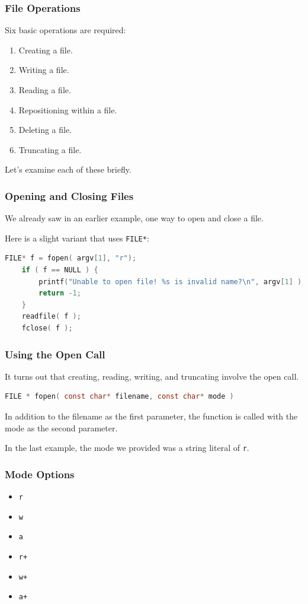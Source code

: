 \begin{frame}
	\frametitle{File Operations}
	Six basic operations are required:

	\begin{enumerate}
		\item Creating a file.
		\item Writing a file.
		\item Reading a file.
		\item Repositioning within a file.
		\item Deleting a file.
		\item Truncating a file.
	\end{enumerate}

	Let's examine each of these briefly.

\end{frame}


\begin{frame}[fragile]
	\frametitle{Opening and Closing Files}
	We already saw in an earlier example, one way to open and close a file.
	
	Here is a slight variant that uses \texttt{FILE*}:
	
	\begin{lstlisting}[language=C]
    FILE* f = fopen( argv[1], "r");
    if ( f == NULL ) {
        printf("Unable to open file! %s is invalid name?\n", argv[1] );
        return -1;
    }
    readfile( f );
    fclose( f );
\end{lstlisting}
\end{frame}



\begin{frame}[fragile]
	\frametitle{Using the Open Call}

	It turns out that creating, reading, writing, and truncating involve the open call.

	\begin{lstlisting}[language=C]
FILE * fopen( const char* filename, const char* mode )
\end{lstlisting}

	In addition to the filename as the first parameter, the function is called with the mode as the second parameter.

	In the last example, the mode we provided was a string literal of \texttt{r}.

\end{frame}


\begin{frame}
	\frametitle{Mode Options}

	\begin{itemize}
		\item \texttt{r}
		\item \texttt{w}
		\item \texttt{a}
		\item \texttt{r+}
		\item \texttt{w+}
		\item \texttt{a+}
	\end{itemize}

\end{frame}


